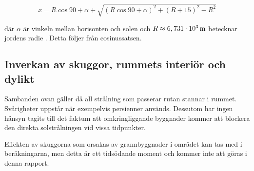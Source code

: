 \begin{equation}
x = R\cos{90+\alpha} + \sqrt{\left(R\cos{90+\alpha}\right)^2 + \left( R+15\right)^2 - R^2}
\end{equation}

där $\alpha$ är vinkeln mellan horisonten och solen och $R\approx\unit[6,731\cdot 10^3]{m}$ betecknar jordens radie \cite{physicshandbook}. Detta följer från cosinussatsen.

\subsection{Inverkan av skuggor, rummets interiör och dylikt}

Sambanden ovan gäller då all strålning som passerar rutan stannar i rummet. Svårigheter uppstår när exempelvis persienner används. Dessutom har ingen hänsyn tagits till det faktum att omkringliggande byggnader kommer att blockera den direkta solstrålningen vid vissa tidpunkter.


Effekten av skuggorna som orsakas av grannbyggnader i området kan tas med i beräkningarna, men detta är ett tidsödande moment och kommer inte att göras i denna rapport.
